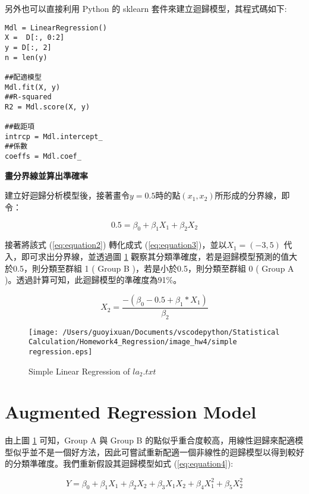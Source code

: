 另外也可以直接利用 Python 的 sklearn 套件來建立迴歸模型，其程式碼如下:

\bigskip
\begin{lstlisting}
Mdl = LinearRegression()
X =  D[:, 0:2]
y = D[:, 2]
n = len(y)

##配適模型
Mdl.fit(X, y) 
##R-squared
R2 = Mdl.score(X, y) 

##截距項
intrcp = Mdl.intercept_ 
##係數
coeffs = Mdl.coef_ 
\end{lstlisting}

\textbf{畫分界線並算出準確率}

建立好迴歸分析模型後，接著畫令$y=0.5$時的點$(x_1, x_2)$所形成的分界線，即令：

\begin{equation}\label{eq:equation2}
0.5 = \beta_0 + \beta_1 X_1 + \beta_2 X_2
\end{equation}

接著將該式 (\ref{eq:equation2}) 轉化成式 (\ref{eq:equation3})，並以$X_1=(-3, 5)$ 代入，即可求出分界線，並透過圖 \ref{fig:simple regression plot} 觀察其分類準確度，若是迴歸模型預測的值大於0.5，則分類至群組 1 ( Group B )，若是小於0.5，則分類至群組 0 ( Group A )。透過計算可知，此迴歸模型的準確度為91$\%$。

\begin{equation}\label{eq:equation3}
X_2 = \frac{-(\beta_0 - 0.5 + \beta_1*X_1)}{\beta_2}
\end{equation}

\begin{figure}[H]
    \centering
        \texttt{[image: /Users/guoyixuan/Documents/vscodepython/Statistical Calculation/Homework4\_Regression/image\_hw4/simple regression.eps]}
    \caption{Simple Linear Regression of $la_2.txt$}
    \label{fig:simple regression plot}
\end{figure}


\section{Augmented Regression Model}

由上圖 \ref{fig:simple regression plot} 可知，Group A 與 Group B 的點似乎重合度較高，用線性迴歸來配適模型似乎並不是一個好方法，因此可嘗試重新配適一個非線性的迴歸模型以得到較好的分類準確度。我們重新假設其迴歸模型如式 (\ref{eq:equation4}):

\begin{equation}\label{eq:equation4}
Y = \beta_0 + \beta_1 X_1 + \beta_2 X_2 + \beta_3 X_1 X_2 + \beta_4 X_1^{2} + \beta_5 X_2^{2}
\end{equation}

